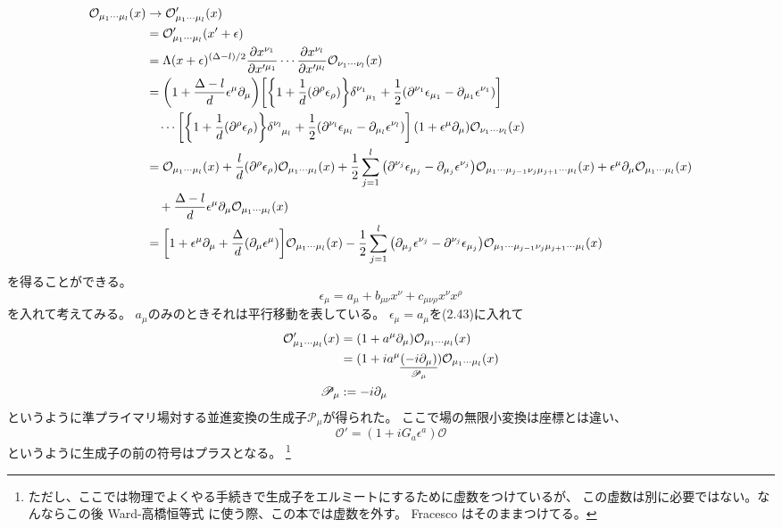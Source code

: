 \documentclass[../../master.tex]{subfiles}
\begin{document}
\begin{align}
    \mathcal{O}_{\mu_1\cdots\mu_l}(x)
    &\rightarrow \mathcal{O}'_{\mu_1\cdots\mu_l}(x) \notag\\
    &= \mathcal{O}'_{\mu_1\cdots\mu_l}(x'+\epsilon) \notag\\
    &= \Lambda(x+\epsilon)^{(\Delta-l)/2}\pdv{x^{\nu_1}}{x'^{\mu_1}}\cdots\pdv{x^{\nu_l}}{x'^{\mu_l}} (1+\epsilon^\mu\partial_\mu)\mathcal{O}_{\nu_1\cdots\nu_l}(x) \notag\\
    &= \qty(1+\frac{\Delta-l}{d}\epsilon^\mu\partial_\mu)
        \qty[\qty{1+\frac{1}{d}(\partial^\rho \epsilon_\rho)}\tensor{\delta}{^{\nu_1}_{\mu_1}} + \frac{1}{2}\qty(\partial^{\nu_1} \epsilon_{\mu_1}
        -\partial_{\mu_1} \epsilon^{\nu_1})]\notag\\
        &\quad \cdots
        \qty[\qty{1+\frac{1}{d}(\partial^\rho \epsilon_\rho)}\tensor{\delta}{^{\nu_l}_{\mu_l}} + \frac{1}{2}\qty(\partial^{\nu_l} \epsilon_{\mu_l}
        -\partial_{\mu_l} \epsilon^{\nu_l})]
        (1+\epsilon^\mu\partial_\mu)\mathcal{O}_{\nu_1\cdots\nu_l}(x) \notag\\
    &= \mathcal{O}_{\mu_1\cdots\mu_l}(x) + \frac{l}{d}(\partial^\rho \epsilon_\rho)\mathcal{O}_{\mu_1\cdots\mu_l}(x)
        +\frac{1}{2}\sum_{j=1}^l \qty(\partial^{\nu_j} \epsilon_{\mu_j}-\partial_{\mu_j} \epsilon^{\nu_j})\mathcal{O}_{\mu_1\cdots\mu_{j-1}\nu_j\mu_{j+1}\cdots\mu_l}(x)
        + \epsilon^\mu\partial_\mu\mathcal{O}_{\mu_1\cdots\mu_l}(x) \notag\\
        &\quad + \frac{\Delta-l}{d} \epsilon^\mu \partial_\mu \mathcal{O}_{\mu_1\cdots\mu_l}(x)\notag\\
    &= \qty[1+\epsilon^\mu\partial_\mu +\frac{\Delta}{d}(\partial_\mu\epsilon^\mu)]\mathcal{O}_{\mu_1\cdots\mu_l}(x)
        -\frac{1}{2}\sum_{j=1}^l \qty(\partial_{\mu_j} \epsilon^{\nu_j}-\partial^{\nu_j} \epsilon_{\mu_j})\mathcal{O}_{\mu_1\cdots\mu_{j-1}\nu_j\mu_{j+1}\cdots\mu_l}(x)
\end{align}
を得ることができる。
\begin{equation*}
    \epsilon_\mu = a_\mu + b_{\mu\nu}x^\nu + c_{\mu\nu\rho}x^\nu x^\rho \tag{2.10}
\end{equation*}
を入れて考えてみる。
\(a_\mu\)のみのときそれは平行移動を表している。
\(\epsilon_\mu = a_\mu\)を(2.43)に入れて
\begin{align}
    \mathcal{O}'_{\mu_1\cdots\mu_l}(x)
    &= (1 + a^\mu \partial_\mu)\mathcal{O}_{\mu_1\cdots\mu_l}(x)\notag\\
    &= (1 +i a^\mu \underset{\mathscr{P}_\mu}{\underline{(-i\partial_\mu)}})\mathcal{O}_{\mu_1\cdots\mu_l}(x) \notag\\
    \mathscr{P}_\mu &:= -i\partial_\mu
\end{align}
というように準プライマリ場対する並進変換の生成子\(\mathscr{P}_\mu\)が得られた。
ここで場の無限小変換は座標とは違い、
\begin{equation*}
    \mathcal{O}' = (1 +iG_a \epsilon^a)\mathcal{O}
\end{equation*}
というように生成子の前の符号はプラスとなる。
\footnote{ただし、ここでは物理でよくやる手続きで生成子をエルミートにするために虚数をつけているが、
この虚数は別に必要ではない。なんならこの後 Ward-高橋恒等式 に使う際、この本では虚数を外す。
Fracesco はそのままつけてる。}
\end{document}
